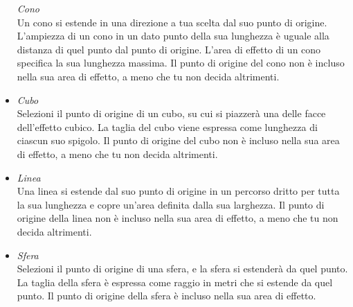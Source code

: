 \begin{multicols}{2}
\begin{itemize}
\textit{Cono}\\
Un cono si estende in una direzione a tua scelta dal suo punto di origine. L'ampiezza di un cono in un dato punto della sua lunghezza è uguale alla distanza di quel punto dal punto di origine. L'area di effetto di un cono specifica la sua lunghezza massima. Il punto di origine del cono non è incluso nella sua area di effetto, a meno che tu non decida altrimenti.\\
\item
\textit{Cubo}\\
Selezioni il punto di origine di un cubo, su cui si piazzerà una delle facce dell'effetto cubico. La taglia del cubo viene espressa come lunghezza di ciascun suo spigolo. Il punto di origine del cubo non è incluso nella sua area di effetto, a meno che tu non decida altrimenti.\\
\item
\textit{Linea}\\
Una linea si estende dal suo punto di origine in un percorso dritto per tutta la sua lunghezza e copre un'area definita dalla sua larghezza. Il punto di origine della linea non è incluso nella sua area di effetto, a meno che tu non decida altrimenti.\\
\item
\textit{Sfera}\\
Selezioni il punto di origine di una sfera, e la sfera si estenderà da quel punto. La taglia della sfera è espressa come raggio in metri che si estende da quel punto.
Il punto di origine della sfera è incluso nella sua area di effetto.\\
\end{itemize}




\end{multicols}
